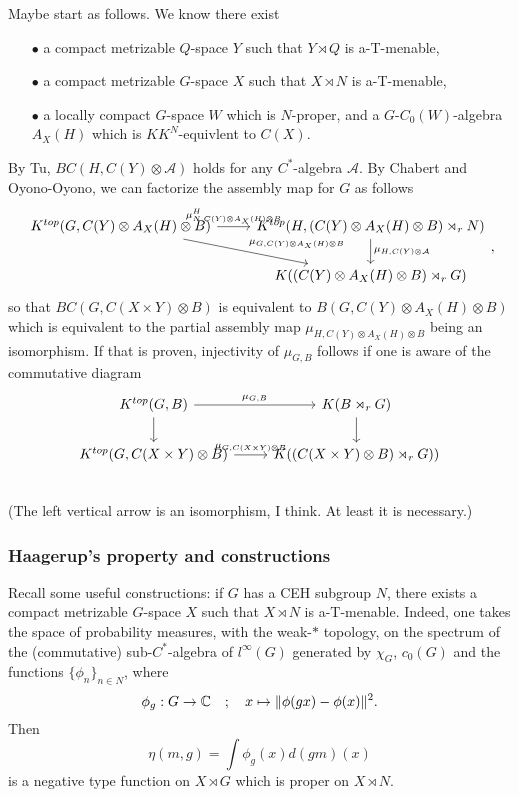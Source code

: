 Maybe start as follows. We know there exist
\begin{itemize}
\item[$\bullet$] a compact metrizable $Q$-space $Y$ such that $Y\rtimes Q$ is a-T-menable,
\item[$\bullet$] a compact metrizable $G$-space $X$ such that $X\rtimes N$ is a-T-menable,
\item[$\bullet$] a locally compact $G$-space $W$ which is $N$-proper, and a $G$-$C_0(W)$-algebra $A_X(H)$ which is $KK^N$-equivlent to $C(X)$. 
\end{itemize}
By Tu, $BC(H, C(Y)\otimes\mathcal A)$ holds for any $C^*$-algebra $\mathcal A$. By Chabert and Oyono-Oyono, we can factorize the assembly map for $G$ as follows
\[\begin{tikzcd}
K^{top}(G, C(Y)\otimes A_X(H)\otimes B) \arrow{rd}{\mu_{G, C(Y)\otimes A_X(H)\otimes B}}\arrow{r}{\mu_{N,C(Y)\otimes A_X(H)\otimes B}^H} 
		& K^{top}(H, (C(Y)\otimes A_X(H)\otimes B)\rtimes_r N) \arrow{d}{\mu_{H , C(Y)\otimes \mathcal A}} \\
		& K((C(Y)\otimes A_X(H)\otimes B)\rtimes_r G)\end{tikzcd},\] 
so that $BC(G,C(X\times Y)\otimes B)$ is equivalent to $B(G, C(Y)\otimes A_X(H)\otimes B)$ which is equivalent to the partial assembly map $\mu_{H, C(Y)\otimes A_X(H)\otimes B}$ being an isomorphism. If that is proven, injectivity of $\mu_{G,B}$ follows if one is aware of the commutative diagram
\[\begin{tikzcd}
K^{top}(G,B)\arrow{d} \arrow{r}{\mu_{G,B}} & K(B\rtimes_r G) \arrow{d} \\
K^{top}(G, C(X\times Y)\otimes B) \arrow{r}{ \mu_{G,C(X\times Y)\otimes B} } & K( (C(X\times Y)\otimes B)\rtimes_r G)) \\
\end{tikzcd}\]
(The left vertical arrow is an isomorphism, I think. At least it is necessary.)

\subsubsection*{Haagerup's property and constructions}
Recall some useful constructions: if $G$ has a CEH subgroup $N$, there exists a compact metrizable $G$-space $X$ such that $X\rtimes N$ is a-T-menable. Indeed, one takes the space of probability measures, with the weak-$*$ topology, on the spectrum of the (commutative) sub-$C^*$-algebra of $l^\infty (G)$ generated by $\chi_G$, $c_0(G)$ and the functions $\{\phi_n\}_{n\in N}$, where
\[\phi_g : G\rightarrow \mathbb C  \quad ;\quad x \mapsto \| \phi(gx) - \phi(x) \|^2. \] 
Then 
\[\eta (m,g) = \int \phi_g(x)d(gm)(x)\]
is a negative type function on $X\rtimes G$ which is proper on $X\rtimes N$.\\

